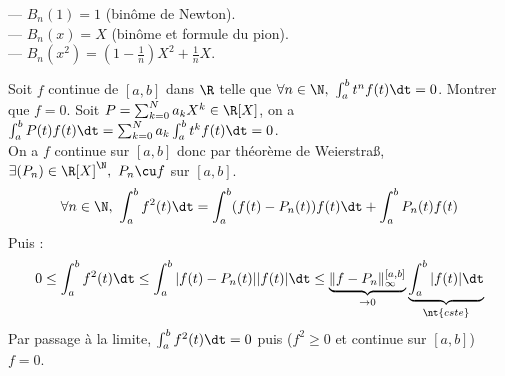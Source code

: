 \documentclass[11pt]{article}
\begin{document}
\begin{ex}{}{}
    --- $B_n(1)=1$ (binôme de Newton).\\
    --- $B_n(x)=X$ (binôme et formule du pion).\\
    --- $B_n(x^2)=\left(1-\frac{1}{n}\right)X^2+\frac{1}{n}X$.
\end{ex}

\begin{exercice}{}{}
    Soit $f$ continue de $[a,b]$ dans $\R$ telle que $\forall n \in \N, ~ \int_a^bt^nf(t)\dt=0$. Montrer que $f=0$.
    \tcblower
    Soit $P=\sum_{k=0}^Na_kX^k\in\R[X]$, on a $\int_a^bP(t)f(t)\dt=\sum_{k=0}^Na_k\int_a^bt^kf(t)\dt=0$.\\
    On a $f$ continue sur $[a,b]$ donc par théorème de Weierstraß, $\exists (P_n)\in\R[X]^\N, ~ P_n\cu f$ sur $[a,b]$.
    \begin{equation*}
        \forall n \in \N, ~ \int_a^bf^2(t)\dt=\int_a^b(f(t)-P_n(t))f(t)\dt + \int_a^bP_n(t)f(t)
    \end{equation*}
    Puis :
    \begin{equation*}
        0 \leq \int_a^bf^2(t)\dt \leq \int_a^b|f(t)-P_n(t)||f(t)|\dt\leq\underbrace{\|f-P_n\|_\infty^{[a,b]}}_{\to0}\underbrace{\int_a^b|f(t)|\dt}_{\nt{cste}}
    \end{equation*}
    Par passage à la limite, $\int_a^bf^2(t)\dt=0$ puis ($f^2\geq0$ et continue sur $[a,b]$) $f=0$.
\end{exercice}

\pagebreak
\end{document}
